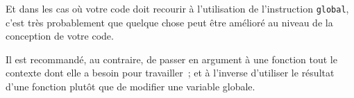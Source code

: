 Et dans les cas où votre code doit recourir à l'utilisation de
l'instruction \texttt{global}, c'est très probablement que quelque chose
peut être amélioré au niveau de la conception de votre code.

Il est recommandé, au contraire, de passer en argument à une fonction
tout le contexte dont elle a besoin pour travailler~; et à l'inverse
d'utiliser le résultat d'une fonction plutôt que de modifier une
variable globale.


    
    
    
